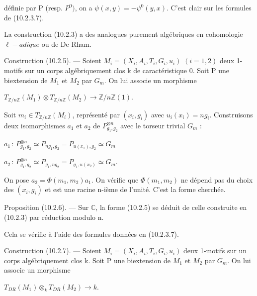 \documentclass[11pt,twoside]{article}
\newcommand{\DFormula}[1]{%
  \par\smallskip\noindent\hspace*{0pt}\(\displaystyle #1\)\par\smallskip
}
\begin{document}
définie par P (resp. \(P^{0})\), on a \(\psi (x,y)=−\psi ^{0}(y,x)\). C’est clair sur les formules de (10.2.3.7).\par
\par\medskip
La construction (10.2.3) a des analogues purement algébriques en cohomologie \(\ell -adique\) ou de De Rham.\par
\par\medskip
Construction (10.2.5). — Soient \(M_{i}=(X_{i},A_{i},T_{i},G_{i},u_{i})\) \((i=1,2)\) deux 1-motifs sur un corps algébriquement clos k de caractéristique 0. Soit P une biextension de \(M_{1}\) et \(M_{2}\) par \(G_{m}\). On lui associe un morphisme\par
\par\medskip
\DFormula{T_{\mathbb{Z}/n\mathbb{Z}}(M_{1})\otimes T_{\mathbb{Z}/n\mathbb{Z}}(M_{2})\to \mathbb{Z}/n\mathbb{Z}(1).}
\par\medskip
Soit \(m_{i}\in T_{\mathbb{Z}/n\mathbb{Z}}(M_{i})\), représenté par \((x_{i},g_{i})\) avec \(u_{i}(x_{i})=ng_{i}\). Construisons deux isomorphismes \(a_{1}\) et \(a_{2}\) de \(P_{g_{1},g_{2}}^{\otimes n}\) avec le torseur trivial \(G_{m}\) :\par
\par\medskip
\DFormula{a_{1}\,:\,P_{g_{1},g_{2}}^{\otimes n}\simeq P_{ng_{1},g_{2}}=P_{u(x_{1}),g_{2}}\simeq G_{m}}
\DFormula{a_{2}\,:\,P_{g_{1},g_{2}}^{\otimes n}\simeq P_{g_{1},ng_{2}}=P_{g_{1},u(x_{2})}\simeq G_{m}.}
\par\medskip
On pose \(a_{2}=\Phi (m_{1},m_{2})a_{1}\). On vérifie que \(\Phi (m_{1},m_{2})\) ne dépend pas du choix des \((x_{i},g_{i})\) et est une racine n-ième de l’unité. C’est la forme cherchée.\par
\par\medskip
Proposition (10.2.6). — Sur \(\mathbb{C}\), la forme (10.2.5) se déduit de celle construite en (10.2.3) par réduction modulo n.\par
\par\medskip
Cela se vérifie à l’aide des formules données en (10.2.3.7).\par
\par\medskip
Construction (10.2.7). — Soient \(M_{i}=(X_{i},A_{i},T_{i},G_{i},u_{i})\) deux 1-motifs sur un corps algébriquement clos k. Soit P une biextension de \(M_{1}\) et \(M_{2}\) par \(G_{m}\). On lui associe un morphisme\par
\par\medskip
\DFormula{T_{DR}(M_{1})\otimes _{k}T_{DR}(M_{2})\to k.}
\par\medskip
\end{document}
